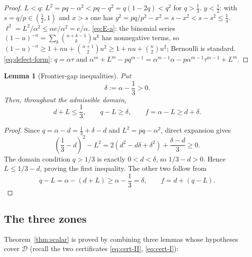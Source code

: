 \documentclass[11pt]{article}
\newtheorem{lemma}[theorem]{Lemma}
\begin{document}
\begin{proof}
$L<q$: $L^2=pq-\alpha^2<pq-q^2=q(1-2q)<q^2$ for $q>\tfrac13$.
$y<\tfrac12$: with $s=q/p\in(\tfrac12,1)$ and $x>s$ one has
$y^2=pq/p^2-x^2=s-x^2<s-s^2\le\tfrac14$.
$\ell^2=L^2/\alpha^2\le\alpha e/\alpha^2=e/\alpha$.
\eqref{eq:E-a}: the binomial series
$(1-u)^{-n}=\sum_k\binom{n+k-1}ku^k$ has nonnegative terms, so
$(1-u)^{-n}\ge1+nu+\binom{n+1}2u^2\ge1+nu+\binom n2u^2$; Bernoulli is
standard.  \eqref{eq:defect-form}: $q=\alpha\tau$ and
$\alpha^m+L^m-pq^{m-1}
=\alpha^{m-1}\alpha-p\alpha^{m-1}\tau^{m-1}+L^m$.
\end{proof}

\begin{lemma}[Frontier-gap inequalities]\label{lem:frontier-gap}
Put
\[
        \delta:=\alpha-\frac13>0.
\]
Then, throughout the admissible domain,
\begin{equation}\label{eq:frontier-gap}
        d+L\le\frac13,
        \qquad q-L\ge\delta,
        \qquad f=\alpha-L\ge d+\delta.
\end{equation}
\end{lemma}

\begin{proof}
Since $q=\alpha-d=\frac13+\delta-d$ and
$L^2=pq-\alpha^2$, direct expansion gives
\[
 \left(\frac13-d\right)^2-L^2
 =2(d^2-d\delta+\delta^2)+\frac{\delta-d}{3}\ge0.
\]
The domain condition $q>1/3$ is exactly $0<d<\delta$, so
$1/3-d>0$.  Hence $L\le1/3-d$, proving the first inequality.  The other two
follow from
\[
 q-L=\alpha-(d+L)\ge\alpha-\frac13=\delta,
 \qquad
 f=d+(q-L).
\]
\end{proof}

\subsection{The three zones}

Theorem~\ref{thm:scalar} is proved by combining three lemmas whose hypotheses
cover $\mathcal D$ (recall the two certificates \eqref{eq:cert-II},
\eqref{eq:cert-I}):
\end{document}
